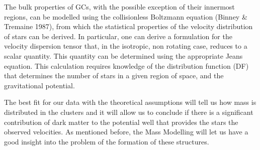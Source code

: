 The bulk properties of GCs, with the possible exception of their innermost regions, can be modelled using the collisionless Boltzmann equation (Binney \& Tremaine 1987), from which the statistical properties of the velocity distribution of stars can be derived. In particular, one can derive a formulation for the velocity dispersion tensor that, in the isotropic, non rotating case, reduces to a scalar quantity. This quantity can be determined using the appropriate Jeans equation. This calculation requires knowledge of the distribution function (DF) that determines the number of stars in a given region of space, and the gravitational potential.

The best fit for our data with the theoretical assumptions will tell us how mass is distributed in the clusters and it will allow us to conclude if there is a significant contribution of dark matter to the potential well that provides the stars the observed velocities. As mentioned before, the Mass Modelling will let us have a good insight into the problem of the formation of these structures.



